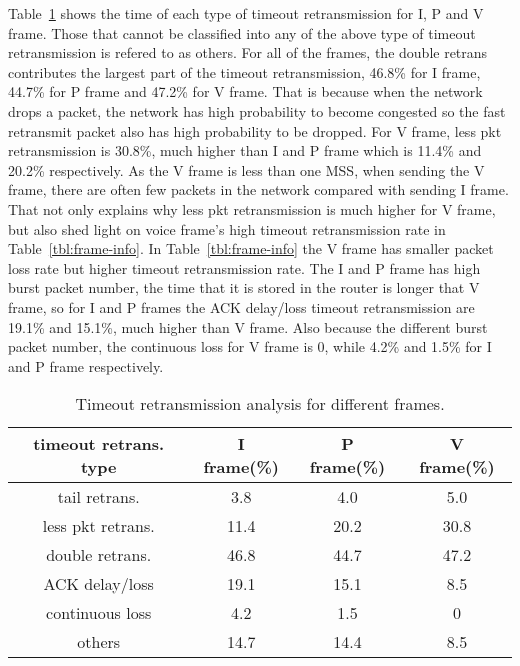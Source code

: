 Table~\ref{tbl:time-out-frame} shows the time of each type of timeout retransmission for I, P and V frame. Those that cannot be classified into any of the above type of timeout retransmission is refered to as others. For all of the frames, the double retrans contributes the largest part of the timeout retransmission, 46.8\% for I frame, 44.7\% for P frame and 47.2\% for V frame. That is because when the network drops a packet, the network has high probability to become congested so the fast retransmit packet also has high probability to be dropped. For V frame, less pkt retransmission is 30.8\%, much higher than I and P frame which is 11.4\% and 20.2\% respectively. As the V frame is less than one MSS, when sending the V frame, there are often few packets in the network compared with sending I frame. That not only explains why less pkt retransmission is much higher for V frame, but also shed light on voice frame's high timeout retransmission rate in Table~\ref{tbl:frame-info}. In Table~\ref{tbl:frame-info} the V frame has smaller packet loss rate but higher timeout retransmission rate. The I and P frame has high burst packet number, the time that it is stored in the router is longer that V frame, so for I and P frames the ACK delay/loss timeout retransmission are 19.1\% and 15.1\%, much higher than V frame. Also because the different burst packet number, the continuous loss for V frame is 0, while 4.2\% and 1.5\% for I and P frame respectively.


\begin{table}[ht]
\tablefontsize
\renewcommand{\arraystretch}{\assize}
 \setlength{\tabcolsep}{3pt}
\caption{Timeout retransmission analysis for different frames.}
\centering
\begin{tabular}{c|c|c|c}
	\toprule
	 timeout retrans. type & I frame(\%) & P frame(\%) & V frame(\%)\\
	\hline
	tail retrans. & 3.8 & 4.0 & 5.0 \\
	\hline
	less pkt retrans. & 11.4 & 20.2 & 30.8 \\
	\hline
	double retrans. & 46.8 & 44.7 & 47.2 \\
	\hline
	ACK delay/loss & 19.1 & 15.1 & 8.5 \\
	\hline
	continuous loss & 4.2 & 1.5 & 0 \\
	\hline
	others & 14.7 & 14.4 & 8.5 \\
	\bottomrule
\end{tabular}
\label{tbl:time-out-frame}
\termspace
\end{table}  



